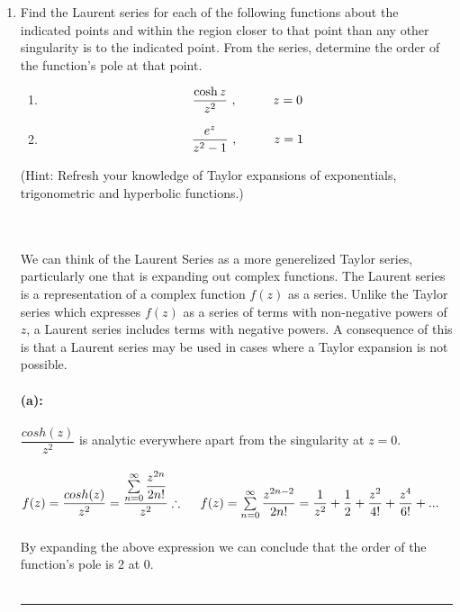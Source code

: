 \documentclass[fleqn]{article}
\begin{document}
\begin{enumerate}
    \item Find the Laurent series for each of the following functions about the indicated points and within the region closer to that point than any other singularity is to the indicated point. From the series, determine the order of the function's pole at that point.
    \begin{enumerate}
      \item $$\frac{\cosh z}{z^2}~, \hskip 1truecm z=0$$
      \item $$\frac{e^z}{z^2-1}~, \hskip 1truecm z=1$$  
    \end{enumerate}
    (Hint: Refresh your knowledge of Taylor expansions of exponentials, trigonometric and hyperbolic functions.)
    
      \textcolor{hwColor}{
        \\
        \\
        We can think of the Laurent Series as a more generelized Taylor series, particularly one that is expanding 
        out complex functions. The Laurent series is a representation of a complex function $f(z)$ as a series.
        Unlike the Taylor series which expresses $f(z)$ as a series of terms with non-negative powers of $z$, a Laurent 
        series includes terms with negative powers. A consequence of this is that a Laurent series may be used in cases where a Taylor expansion is not
        possible.
        \\
        \\
        \textbf{(a):}
        \\
        \\
        $\dfrac{cosh(z)}{z^2}$ is analytic everywhere apart from the singularity at $z=0$.
        \\
        \\
        $
          f(z)=\dfrac{cosh(z)}{z^2}=\dfrac{\sum\limits_{n=0}^{\infty} \dfrac{z^{2n}}{2n!}}{z^2}
          \\
          \\
          \\
          \therefore ~~~~ f(z)=\sum\limits_{n=0}^{\infty} \dfrac{z^{2n-2}}{2n!}=\dfrac{1}{z^2}+\dfrac{1}{2}+\dfrac{z^2}{4!}+\dfrac{z^4}{6!}+...
        $
        \\
        \\
        By expanding the above expression we can conclude that the order of the function's pole is 2 at 0. 
        \\
        \\
        \rule{15cm}{1pt}
}
\end{enumerate}
\end{document}
